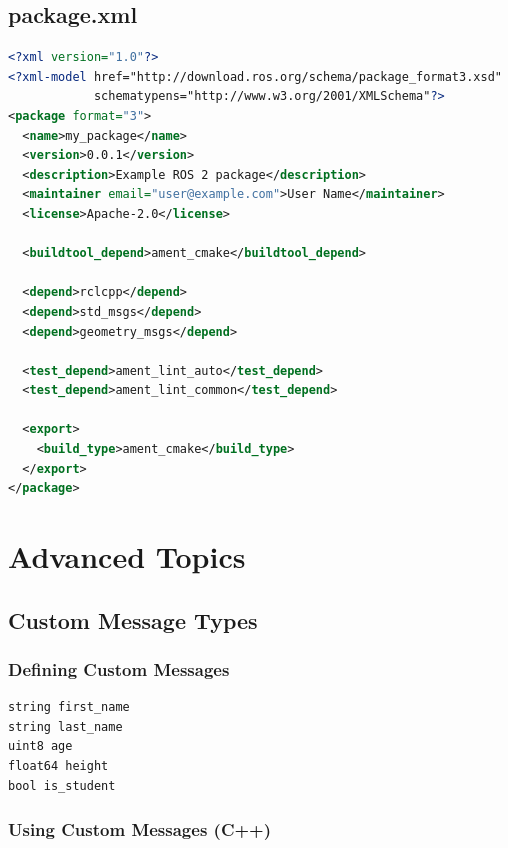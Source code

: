 \documentclass[a4paper,12pt]{book}
\begin{document}
\section{package.xml}

\begin{lstlisting}[language=XML, caption=Example package.xml]
<?xml version="1.0"?>
<?xml-model href="http://download.ros.org/schema/package_format3.xsd" 
            schematypens="http://www.w3.org/2001/XMLSchema"?>
<package format="3">
  <name>my_package</name>
  <version>0.0.1</version>
  <description>Example ROS 2 package</description>
  <maintainer email="user@example.com">User Name</maintainer>
  <license>Apache-2.0</license>

  <buildtool_depend>ament_cmake</buildtool_depend>
  
  <depend>rclcpp</depend>
  <depend>std_msgs</depend>
  <depend>geometry_msgs</depend>
  
  <test_depend>ament_lint_auto</test_depend>
  <test_depend>ament_lint_common</test_depend>

  <export>
    <build_type>ament_cmake</build_type>
  </export>
</package>
\end{lstlisting}

\chapter{Advanced Topics}

\section{Custom Message Types}

\subsection{Defining Custom Messages}

\begin{lstlisting}[caption=Custom Message Definition (PersonMessage.msg)]
string first_name
string last_name
uint8 age
float64 height
bool is_student
\end{lstlisting}

\subsection{Using Custom Messages (C++)}
\end{document}
